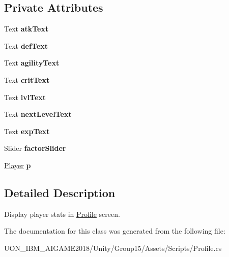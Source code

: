 \subsection*{Private Attributes}
\begin{DoxyCompactItemize}
\item 
\mbox{\label{class_profile_ab602de9682b788a280b0a46c3b5f160a}} 
Text {\bfseries atk\+Text}
\item 
\mbox{\label{class_profile_ae84926103e66a29a5efaa2006609d746}} 
Text {\bfseries def\+Text}
\item 
\mbox{\label{class_profile_a26998b6035cb44a2fd1640899306fbd5}} 
Text {\bfseries agility\+Text}
\item 
\mbox{\label{class_profile_a77a83d4e7a8954edc63e5f510591d3ce}} 
Text {\bfseries crit\+Text}
\item 
\mbox{\label{class_profile_ad21775ca195e41c796f3c014d2bc1066}} 
Text {\bfseries lvl\+Text}
\item 
\mbox{\label{class_profile_a603dea7538d222934d0be46c96b2dd79}} 
Text {\bfseries next\+Level\+Text}
\item 
\mbox{\label{class_profile_afdf8e373da9625e574c6056eeaec4688}} 
Text {\bfseries exp\+Text}
\item 
\mbox{\label{class_profile_ad24ddb960c2358206baf0bf58306127f}} 
Slider {\bfseries factor\+Slider}
\item 
\mbox{\label{class_profile_aaec42519f918113556cc3bc48d4c9680}} 
\mbox{\hyperlink{class_player}{Player}} {\bfseries p}
\end{DoxyCompactItemize}


\subsection{Detailed Description}
Display player stats in \mbox{\hyperlink{class_profile}{Profile}} screen. 

The documentation for this class was generated from the following file\+:\begin{DoxyCompactItemize}
\item 
U\+O\+N\+\_\+\+I\+B\+M\+\_\+\+A\+I\+G\+A\+M\+E2018/\+Unity/\+Group15/\+Assets/\+Scripts/Profile.\+cs\end{DoxyCompactItemize}
